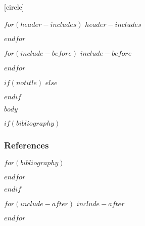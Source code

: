 [circle]


$for(header-includes)$
$header-includes$

$endfor$



    $for(include-before)$
    $include-before$

    $endfor$

    $if(notitle)$
    $else$
    \maketitle
    $endif$

    $body$

    $if(bibliography)$
    \begin{frame}[allowframebreaks]
        \frametitle{References}
        
        $for(bibliography)$
        
        $endfor$
    \end{frame}
    $endif$

    $for(include-after)$
    $include-after$

    $endfor$


